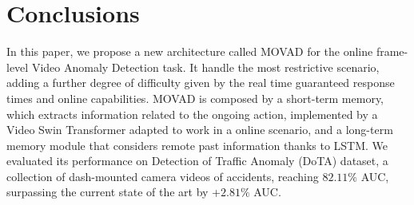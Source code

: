\section{Conclusions}
\label{sec:conclusions}

In this paper, we propose a new architecture called MOVAD for the online frame-level Video Anomaly Detection task.
It handle the most restrictive scenario, adding a further degree of difficulty given by the real time guaranteed response times and online capabilities.
MOVAD is composed by a short-term memory, which extracts information related to the ongoing action, implemented by a Video Swin Transformer adapted to work in a online scenario, and a long-term memory module that considers remote past information thanks to LSTM.
We evaluated its performance on Detection of Traffic Anomaly (DoTA) dataset, a collection of dash-mounted camera videos of accidents, reaching $82.11\%$ AUC, surpassing the current state of the art by +$2.81\%$ AUC.
